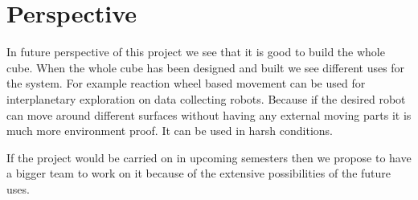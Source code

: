 \section{Perspective}

In future perspective of this project we see that it is good to build the whole cube.
When the whole cube has been designed and built we see different uses for the system.
For example reaction wheel based movement can be used for interplanetary exploration on data collecting robots.
Because if the desired robot can move around different surfaces without having any external moving parts it is much more environment proof.
It can be used in harsh conditions.

If the project would be carried on in upcoming semesters then we propose to have a bigger team to work on it because of the extensive possibilities of the future uses.

